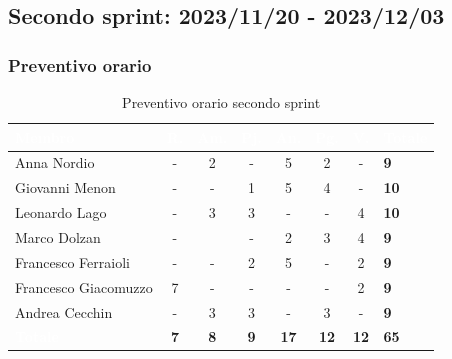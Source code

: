\newpage


\subsection{Secondo sprint: 2023/11/20 - 2023/12/03}

\subsubsection{Preventivo orario}

{
\setlength{\tabcolsep}{10pt}
\renewcommand{\arraystretch}{1.5}
\begin{table}[h!]
    \centering
    \begin{tabularx}{\textwidth}{| l | c | c | c | c | c | c | X |}
        \hline
        \rowcolor{headerrow} \textbf{\textcolor{white}{Membro}} & \textbf{\textcolor{white}{R.}} & \textbf{\textcolor{white}{Am.}} & \textbf{\textcolor{white}{Pj.}} & \textbf{\textcolor{white}{An.}} & \textbf{\textcolor{white}{Pg.}} & \textbf{\textcolor{white}{V.}} & \textbf{\textcolor{white}{Totale}} \\
        \hline
        Anna Nordio & - & 2 & - & 5 & 2 & - & \textbf{9} \\
        \hline
        Giovanni Menon & - & - & 1 & 5 & 4 & - & \textbf{10} \\
        \hline
        Leonardo Lago & - & 3 & 3 & - & - & 4 & \textbf{10} \\
        \hline
        Marco Dolzan & - &  & - & 2 & 3 & 4 & \textbf{9} \\
        \hline
        Francesco Ferraioli & - & - & 2 & 5 & - & 2 & \textbf{9} \\
        \hline  
        Francesco Giacomuzzo & 7 & - & - & - & - & 2 & \textbf{9} \\
        \hline
        Andrea Cecchin & - & 3 & 3 & - & 3 & - & \textbf{9} \\
        \hline
    \cellcolor{headerrow} \textbf{\textcolor{white}{Totale}} & \textbf{7} & \textbf{8} & \textbf{9} & \textbf{17} & \textbf{12} & \textbf{12} & \textbf{65} \\
        \hline
    \end{tabularx} 
    \caption{Preventivo orario secondo sprint}
    \label{tab:preventivoorariosecondosprint}
\end{table}
}
